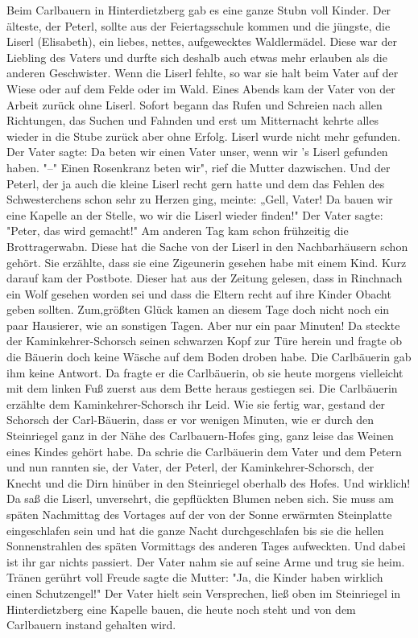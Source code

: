 Beim Carlbauern in Hinterdietzberg gab es eine ganze Stubn voll Kinder. Der
älteste, der Peterl, sollte aus der Feiertagsschule kommen und die jüngste, die
Liserl (Elisabeth), ein liebes, nettes, aufgewecktes Waldlermädel. Diese war der
Liebling des Vaters und durfte sich deshalb auch etwas mehr erlauben als die
anderen Geschwister. Wenn die Liserl fehlte, so war sie halt beim Vater auf der
Wiese oder auf dem Felde oder im Wald. Eines Abends kam der Vater von der Arbeit
zurück ohne Liserl. Sofort begann das Rufen und Schreien nach allen Richtungen,
das Suchen und Fahnden und erst um Mitternacht kehrte alles wieder in die Stube
zurück aber ohne Erfolg. Liserl wurde nicht mehr gefunden. Der Vater sagte: Da
beten wir einen Vater unser, wenn wir 's Liserl gefunden haben. "--" Einen
Rosenkranz beten wir", rief die Mutter dazwischen. Und der Peterl, der ja auch
die kleine Liserl recht gern hatte und dem das Fehlen des Schwesterchens schon
sehr zu Herzen ging, meinte: „Gell, Vater! Da bauen wir eine Kapelle an der
Stelle, wo wir die Liserl wieder finden!" Der Vater sagte: "Peter, das wird
gemacht!" Am anderen Tag kam schon frühzeitig die Brottragerwabn. Diese hat die
Sache von der Liserl in den Nachbarhäusern schon gehört. Sie erzählte, dass sie
eine Zigeunerin gesehen habe mit einem Kind. Kurz darauf kam der Postbote.
Dieser hat aus der Zeitung gelesen, dass in Rinchnach ein Wolf gesehen worden
sei und dass die Eltern recht auf ihre Kinder Obacht geben sollten. Zum,größten
Glück kamen an diesem Tage doch nicht noch ein paar Hausierer, wie an sonstigen
Tagen. Aber nur ein paar Minuten! Da steckte der Kaminkehrer-Schorsch seinen
schwarzen Kopf zur Türe herein und fragte ob die Bäuerin doch keine Wäsche auf
dem Boden droben habe. Die Carlbäuerin gab ihm keine Antwort. Da fragte er die
Carlbäuerin, ob sie heute morgens vielleicht mit dem linken Fuß zuerst aus dem
Bette heraus gestiegen sei. Die Carlbäuerin erzählte dem Kaminkehrer-Schorsch
ihr Leid. Wie sie fertig war, gestand der Schorsch der Carl-Bäuerin, dass er vor
wenigen Minuten, wie er durch den Steinriegel ganz in der Nähe des
Carlbauern-Hofes ging, ganz leise das Weinen eines Kindes gehört habe. Da schrie
die Carlbäuerin dem Vater und dem Petern und nun rannten sie, der Vater, der
Peterl, der Kaminkehrer-Schorsch, der Knecht und die Dirn hinüber in den
Steinriegel oberhalb des Hofes. Und wirklich! Da saß die Liserl, unversehrt, die
gepflückten Blumen neben sich. Sie muss am späten Nachmittag des Vortages auf
der von der Sonne erwärmten Steinplatte eingeschlafen sein und hat die ganze
Nacht durchgeschlafen bis sie die hellen Sonnenstrahlen des späten Vormittags
des anderen Tages aufweckten. Und dabei ist ihr gar nichts passiert. Der Vater
nahm sie auf seine Arme und trug sie heim. Tränen gerührt voll Freude sagte die
Mutter: "Ja, die Kinder haben wirklich einen Schutzengel!" Der Vater hielt sein
Versprechen, ließ oben im Steinriegel in Hinterdietzberg eine Kapelle bauen, die
heute noch steht und von dem Carlbauern instand gehalten wird.

